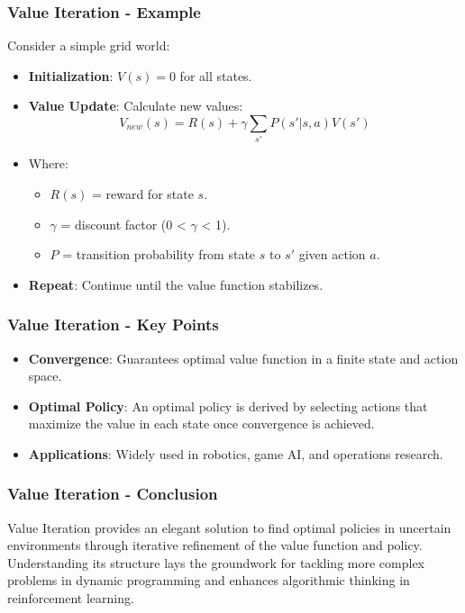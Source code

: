 \documentclass{beamer}
\begin{document}
\begin{frame}[fragile]
    \frametitle{Value Iteration - Example}
    Consider a simple grid world:

    \begin{itemize}
        \item \textbf{Initialization}: $V(s) = 0$ for all states.
        
        \item \textbf{Value Update}: Calculate new values:
        \begin{equation}
            V_{new}(s) = R(s) + \gamma \sum_{s'} P(s'|s,a)V(s')
        \end{equation}
        
        \item Where:
        \begin{itemize}
            \item $R(s)$ = reward for state $s$.
            \item $\gamma$ = discount factor (0 < $\gamma$ < 1).
            \item $P$ = transition probability from state $s$ to $s'$ given action $a$.
        \end{itemize}

        \item \textbf{Repeat}: Continue until the value function stabilizes.
    \end{itemize}
\end{frame}

\begin{frame}[fragile]
    \frametitle{Value Iteration - Key Points}
    \begin{itemize}
        \item \textbf{Convergence}:
        Guarantees optimal value function in a finite state and action space.
        
        \item \textbf{Optimal Policy}:
        An optimal policy is derived by selecting actions that maximize the value in each state once convergence is achieved.
        
        \item \textbf{Applications}:
        Widely used in robotics, game AI, and operations research.
    \end{itemize}
\end{frame}

\begin{frame}[fragile]
    \frametitle{Value Iteration - Conclusion}
    Value Iteration provides an elegant solution to find optimal policies in uncertain environments through iterative refinement of the value function and policy. 
    Understanding its structure lays the groundwork for tackling more complex problems in dynamic programming and enhances algorithmic thinking in reinforcement learning.
\end{frame}
\end{document}
